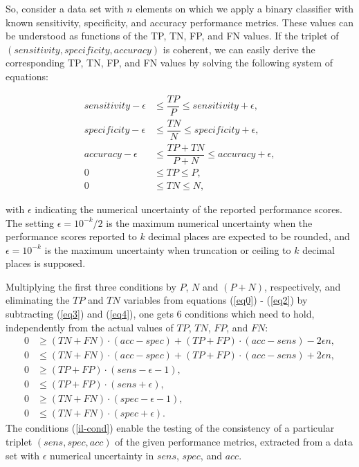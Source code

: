 \documentclass[5p, final]{elsarticle}
\begin{document}
So, consider a data set with $n$ elements on which we apply a binary classifier with known sensitivity, specificity, and accuracy performance metrics. These values can be understood as functions of the TP, TN, FP, and FN values. If the triplet of $(sensitivity, specificity, accuracy)$ is coherent, we can easily derive the corresponding TP, TN, FP, and FN values by solving the following system of equations:

\begin{align}
sensitivity - \epsilon &\leq \dfrac{TP}{P} \leq sensitivity + \epsilon,\label{eq0}\\
specificity - \epsilon &\leq \dfrac{TN}{N} \leq specificity + \epsilon,\label{eq1}\\
accuracy - \epsilon &\leq \dfrac{TP+TN}{P+N} \leq accuracy + \epsilon,\label{eq2}\\
0 &\leq TP\leq P, \label{eq3}\\
0 &\leq TN\leq N, \label{eq4}
\end{align}

\noindent
with $\epsilon$ indicating the numerical uncertainty of the reported performance scores. The setting $\epsilon = 10^{-k}/2$ is the maximum numerical uncertainty when the performance scores reported to $k$ decimal places are expected to be rounded, and $\epsilon = 10^{-k}$ is the maximum uncertainty when truncation or ceiling to $k$ decimal places is supposed.

Multiplying the first three conditions by $P$, $N$ and $(P+N)$, respectively, and eliminating the $TP$ and $TN$ variables from equations (\ref{eq0}) - (\ref{eq2}) by subtracting (\ref{eq3}) and (\ref{eq4}), one gets 6 conditions which need to hold, independently from the actual values of $TP$, $TN$, $FP$, and $FN$:
\begin{align}
0 &\geq (TN+FN)\cdot (acc-spec)+(TP+FP)\cdot (acc-sens)- 2\epsilon n, \nonumber\\
0 &\leq (TN+FN)\cdot (acc-spec)+(TP+FP)\cdot (acc-sens)+ 2\epsilon n, \nonumber\\
0 &\geq (TP+FP)\cdot (sens - \epsilon - 1),\nonumber\\
0 &\leq (TP+FP)\cdot (sens + \epsilon),\nonumber\\
0 &\geq (TN+FN)\cdot (spec - \epsilon - 1),\nonumber\\
0 &\leq (TN+FN)\cdot (spec + \epsilon). \label{il-cond}
\end{align}
The conditions (\ref{il-cond}) enable the testing of the consistency of a particular triplet $(sens, spec, acc)$ of the given performance metrics, extracted from a data set with $\epsilon$ numerical uncertainty in $sens$, $spec$, and $acc$. 
\end{document}
